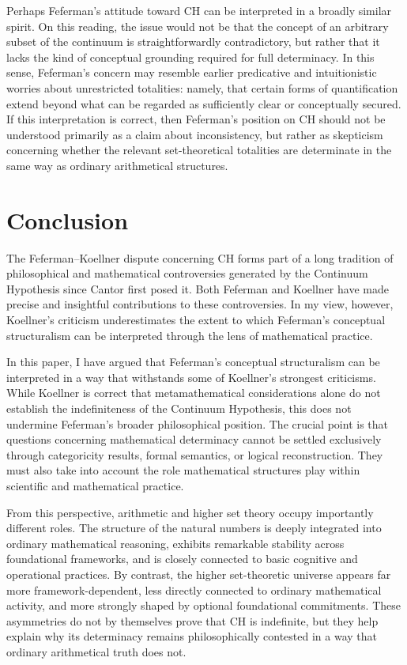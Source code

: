 \documentclass[11pt,a4paper]{book}
\theoremstyle{plain}
\begin{document}
Perhaps Feferman's attitude toward CH can be interpreted in a broadly similar spirit. On this reading, the issue would not be that the concept of an arbitrary subset of the continuum is straightforwardly contradictory, but rather that it lacks the kind of conceptual grounding required for full determinacy. In this sense, Feferman's concern may resemble earlier predicative and intuitionistic worries about unrestricted totalities: namely, that certain forms of quantification extend beyond what can be regarded as sufficiently clear or conceptually secured. If this interpretation is correct, then Feferman's position on CH should not be understood primarily as a claim about inconsistency, but rather as skepticism concerning whether the relevant set-theoretical totalities are determinate in the same way as ordinary arithmetical structures.

\section{Conclusion}
\label{conclusion-chapter1}

The Feferman--Koellner dispute concerning CH forms part of a long tradition of philosophical and mathematical controversies generated by the Continuum Hypothesis since Cantor first posed it. Both Feferman and Koellner have made precise and insightful contributions to these controversies. In my view, however, Koellner's criticism underestimates the extent to which Feferman's conceptual structuralism can be interpreted through the lens of mathematical practice.

In this paper, I have argued that Feferman's conceptual structuralism can be interpreted in a way that withstands some of Koellner's strongest criticisms. While Koellner is correct that metamathematical considerations alone do not establish the indefiniteness of the Continuum Hypothesis, this does not undermine Feferman's broader philosophical position. The crucial point is that questions concerning mathematical determinacy cannot be settled exclusively through categoricity results, formal semantics, or logical reconstruction. They must also take into account the role mathematical structures play within scientific and mathematical practice.

From this perspective, arithmetic and higher set theory occupy importantly different roles. The structure of the natural numbers is deeply integrated into ordinary mathematical reasoning, exhibits remarkable stability across foundational frameworks, and is closely connected to basic cognitive and operational practices. By contrast, the higher set-theoretic universe appears far more framework-dependent, less directly connected to ordinary mathematical activity, and more strongly shaped by optional foundational commitments. These asymmetries do not by themselves prove that CH is indefinite, but they help explain why its determinacy remains philosophically contested in a way that ordinary arithmetical truth does not.
\end{document}
